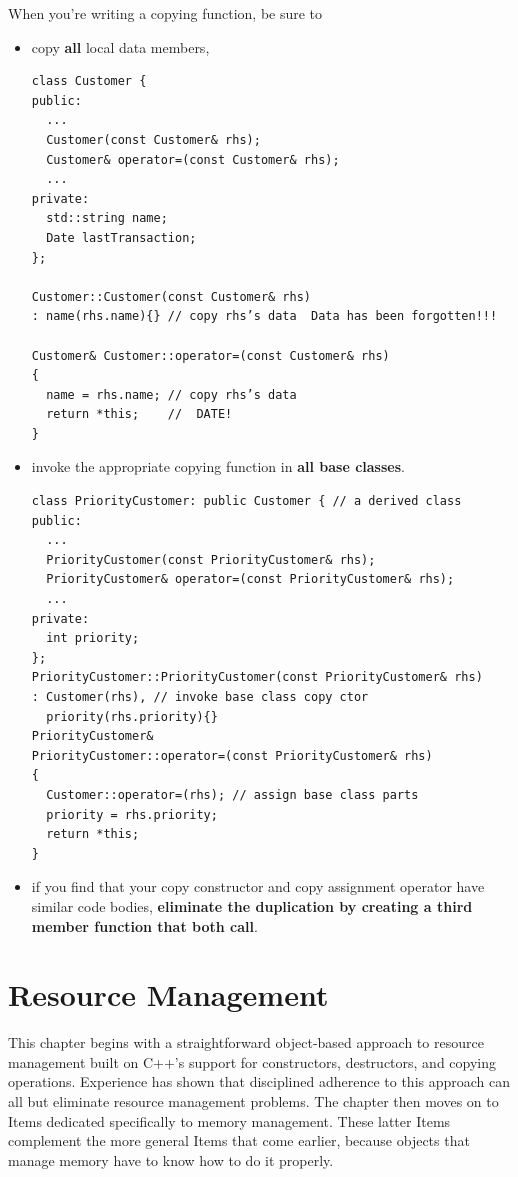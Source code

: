 \documentclass[a4paper,twoside]{article}
\theoremstyle{definition}
\theoremstyle{remark}
\numberwithin{equation}{section}
\begin{document}
When you're writing a copying function, be sure to
\begin{itemize}
\item copy \textbf{all} local data members,
\begin{verbatim}
class Customer {
public:
  ...
  Customer(const Customer& rhs);
  Customer& operator=(const Customer& rhs);
  ...
private:
  std::string name;
  Date lastTransaction;
};

Customer::Customer(const Customer& rhs)
: name(rhs.name){} // copy rhs’s data  Data has been forgotten!!!

Customer& Customer::operator=(const Customer& rhs)
{
  name = rhs.name; // copy rhs’s data
  return *this;    //  DATE!
}
\end{verbatim}
\item invoke the appropriate copying function in \textbf{all base
    classes}.
\begin{verbatim}
class PriorityCustomer: public Customer { // a derived class
public:
  ...
  PriorityCustomer(const PriorityCustomer& rhs);
  PriorityCustomer& operator=(const PriorityCustomer& rhs);
  ...
private:
  int priority;
};
PriorityCustomer::PriorityCustomer(const PriorityCustomer& rhs)
: Customer(rhs), // invoke base class copy ctor
  priority(rhs.priority){}
PriorityCustomer&
PriorityCustomer::operator=(const PriorityCustomer& rhs)
{
  Customer::operator=(rhs); // assign base class parts
  priority = rhs.priority;
  return *this;
}
\end{verbatim}
\item if you find that your copy constructor and copy assignment
operator have similar code bodies, \textbf{eliminate the duplication by
creating a third member function that both call}.
\end{itemize}

\clearpage
\section{Resource Management}

This chapter begins with a straightforward object-based approach to
resource management built on C++'s support for constructors,
destructors, and copying operations. Experience has shown that
disciplined adherence to this approach can all but eliminate resource
management problems. The chapter then moves on to Items dedicated
specifically to memory management. These latter Items complement
the more general Items that come earlier, because objects that manage
memory have to know how to do it properly.
\end{document}
